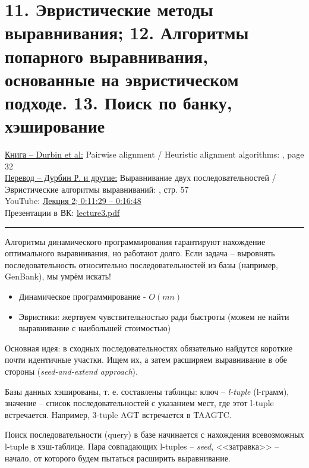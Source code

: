 \documentclass[a4paper,12pt]{article} %
\begin{document}
\section{11. Эвристические методы выравнивания; 12. Алгоритмы попарного выравнивания, основанные на эвристическом подходе. 13. Поиск по банку, хэширование}
\href{https://vk.com/doc155237002_518129852?hash=c14fcc0da730fc8e60}{Книга -- Durbin et al:} Pairwise alignment / Heuristic alignment algorithms: , page 32 \\
\href{https://vk.com/doc155237002_518129974?hash=8b75ee93da5460098c}{Перевод -- Дурбин Р. и другие:} Выравнивание двух последовательностей / Эвристические алгоритмы выравниваний: , стр. 57 \\
YouTube: \href{https://youtu.be/gGoYQBBEX8M?t=689}{Лекция 2; 0:11:29 -- 0:16:48} \\
Презентации в ВК: \href{https://vk.com/doc155237002_519204981?hash=9c4f1a66b95c4fd7fa}{lecture3.pdf}
\hrule
Алгоритмы динамического программирования гарантируют нахождение оптимального выравнивания, но работают долго. Если задача -- выровнять последовательность относительно последовательностей из базы (например, GenBank), мы умрём искать!

\begin{itemize}
	\item Динамическое программирование - $O(mn)$
	\item Эвристики: жертвуем чувствительностью ради быстроты (можем не найти выравнивание с наибольшей стоимостью)
\end{itemize}
Основная идея: в сходных последовательностях обязательно найдутся короткие почти идентичные участки. Ищем их, а затем расширяем выравнивание в обе стороны (\textit{seed-and-extend approach}).

Базы данных хэшированы, т. е. составлены таблицы: ключ -- \textit{l-tuple} (l-грамм), значение -- список последовательностей с указанием мест, где этот l-tuple встречается. Например, 3-tuple AGT встречается в TAAGTC. 

Поиск последовательности (query) в базе начинается с нахождения всевозможных l-tuple в хэш-таблице. Пара совпадающих l-tuples -- \textit{seed}, <<затравка>> -- начало, от которого будем пытаться расширить выравнивание. 



	
\end{document}
